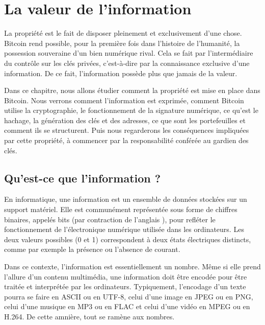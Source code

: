 
\chapter{La valeur de l'information}

La propriété est le fait de disposer pleinement et exclusivement d'une chose. Bitcoin rend possible, pour la première fois dans l'histoire de l'humanité, la possession souveraine d'un bien numérique rival. Cela se fait par l'intermédiaire du contrôle sur les clés privées, c'est-à-dire par la connaissance exclusive d'une information. De ce fait, l'information possède plus que jamais de la valeur.

Dans ce chapitre, nous allons étudier comment la propriété est mise en place dans Bitcoin. Nous verrons comment l'information est exprimée, comment Bitcoin utilise la cryptographie, le fonctionnement de la signature numérique, ce qu'est le hachage, la génération des clés et des adresses, ce que sont les portefeuilles et comment ils se structurent. Puis nous regarderons les conséquences impliquées par cette propriété, à commencer par la responsabilité conférée au gardien des clés.

\section{Qu'est-ce que l'information ?}


En informatique, une information est un ensemble de données stockées sur un support matériel. Elle est communément représentée sous forme de chiffres binaires, appelés bits (par contraction de l'anglais ), pour refléter le fonctionnement de l'électronique numérique utilisée dans les ordinateurs. Les deux valeurs possibles (0 et 1) correspondent à deux états électriques distincts, comme par exemple la présence ou l'absence de courant. %

Dans ce contexte, l'information est essentiellement un nombre. Même si elle prend l'allure d'un contenu multimédia, une information doit être encodée pour être traitée et interprétée par les ordinateurs. Typiquement, l'encodage d'un texte pourra se faire en ASCII ou en UTF-8, celui d'une image en JPEG ou en PNG, celui d'une musique en MP3 ou en FLAC et celui d'une vidéo en MPEG ou en H.264. De cette amnière, tout se ramène aux nombres.

